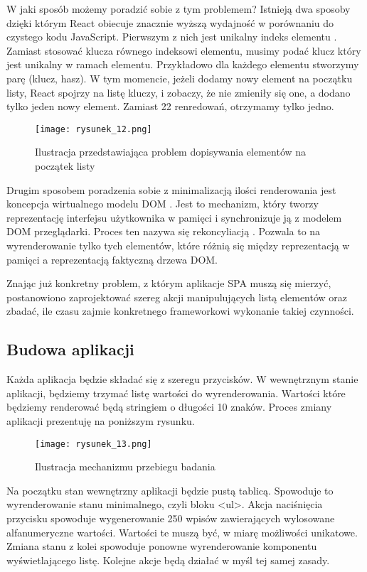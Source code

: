 W jaki sposób możemy poradzić sobie z tym problemem? Istnieją dwa sposoby dzięki którym React obiecuje znacznie wyższą wydajność w porównaniu do czystego kodu JavaScript.
Pierwszym z nich jest unikalny indeks elementu \cite{react-lists}. Zamiast stosować klucza równego indeksowi elementu, musimy podać klucz który jest unikalny w ramach elementu.
Przykładowo dla każdego elementu stworzymy parę (klucz, hasz). W tym momencie, jeżeli dodamy nowy element na początku listy, React spojrzy na listę kluczy, i zobaczy, że nie zmieniły się one, a dodano tylko jeden nowy element.
Zamiast 22 renredowań, otrzymamy tylko jedno.

\begin{figure}[htbp]
    \centering
    \texttt{[image: rysunek\_12.png]}
    \caption{Ilustracja przedstawiająca problem dopisywania elementów na początek listy}
    \label{fig:rysunek_12}
\end{figure}

Drugim sposobem poradzenia sobie z minimalizacją ilości renderowania jest koncepcja wirtualnego modelu DOM \cite{virtualdom}.
Jest to mechanizm, który tworzy reprezentację interfejsu użytkownika w pamięci i synchronizuje ją z modelem DOM przeglądarki. Proces ten nazywa się rekoncyliacją \cite{reconcilation}.
Pozwala to na wyrenderowanie tylko tych elementów, które różnią się między reprezentacją w pamięci a reprezentacją faktyczną drzewa DOM.

Znając już konkretny problem, z którym aplikacje SPA muszą się mierzyć, postanowiono zaprojektować szereg akcji manipulujących listą elementów oraz zbadać, ile czasu zajmie konkretnego frameworkowi wykonanie takiej czynności.

\subsection{Budowa aplikacji}

Każda aplikacja będzie składać się z szeregu przycisków. W wewnętrznym stanie aplikacji, będziemy trzymać listę wartości do wyrenderowania. Wartości które będziemy renderować będą stringiem o długości 10 znaków. Proces zmiany aplikacji prezentuję na poniższym rysunku.
\begin{figure}[htbp]
    \centering
    \texttt{[image: rysunek\_13.png]}
    \caption{Ilustracja mechanizmu przebiegu badania}
    \label{fig:rysunek_13}
\end{figure}

Na początku stan wewnętrzny aplikacji będzie pustą tablicą. Spowoduje to wyrenderowanie stanu minimalnego, czyli bloku <ul>.
Akcja naciśnięcia przycisku spowoduje wygenerowanie 250 wpisów zawierających wylosowane alfanumeryczne wartości. Wartości te muszą być, w miarę możliwości unikatowe.
Zmiana stanu z kolei spowoduje ponowne wyrenderowanie komponentu wyświetlającego listę. Kolejne akcje będą działać w myśl tej samej zasady.

